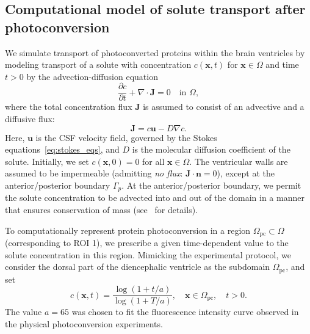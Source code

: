 \documentclass[fleqn]{wlscirep}
\newcommand{\pdifft}[1]{\frac{\partial  #1}{\partial t}}
\newcommand{\nn}{\mathbf{n}}
\newcommand{\uu}{\mathbf{u}}
\newcommand{\xx}{\bm{x}}
\newcommand{\JJ}{\mathbf{J}}
\begin{document}
\subsection*{Computational model of solute transport after photoconversion}
We simulate transport of photoconverted proteins within the brain ventricles by
modeling transport of a solute with concentration $c(\xx, t)$ for $\xx\in\Omega$ and
time $t > 0$ by the advection-diffusion equation
\begin{equation}
    \pdifft{c} + \nabla\cdot\JJ = 0 \quad \text{in } \Omega,
    \label{eq:adv_diff_strong}
\end{equation}
where the total concentration flux $\mathbf{J}$ is assumed to consist of an advective and a diffusive flux:
\begin{equation*}
    \JJ = c\uu - D\nabla c .
\end{equation*}
Here, $\uu$ is the CSF velocity field, governed by the Stokes equations~\eqref{eq:stokes_eqs},
and $D$ is the molecular diffusion coefficient of the solute.
Initially, we set $c(\xx, 0)=0$ for all $\xx\in\Omega$.
The ventricular walls are assumed to be impermeable (admitting \emph{no flux}: $\JJ\cdot\nn=0$),
except at the anterior/posterior boundary $\Gamma_p$.
At the anterior/posterior boundary, we permit the solute concentration to be advected into
and out of the domain in a manner that ensures conservation of mass
(see~ for details).

To computationally represent protein photoconversion in a region
$\Omega_{\mathrm{pc}} \subset \Omega$ (corresponding to ROI 1),
we prescribe a given time-dependent value to the solute concentration in this region. 
Mimicking the experimental protocol, we consider the dorsal part of the
diencephalic ventricle as the subdomain $\Omega_{\mathrm{pc}}$, and set
\begin{equation}
  c(\xx, t)=\frac{\log{(1+t/a)}}{\log{(1+T/a)}},
  \quad \xx \in \Omega_{\mathrm{pc}}, \quad t > 0.
\label{eq:photoconversion_curve}
\end{equation}
The value $a=65$ was chosen to fit the fluorescence intensity curve
observed in the physical photoconversion experiments.
\end{document}
